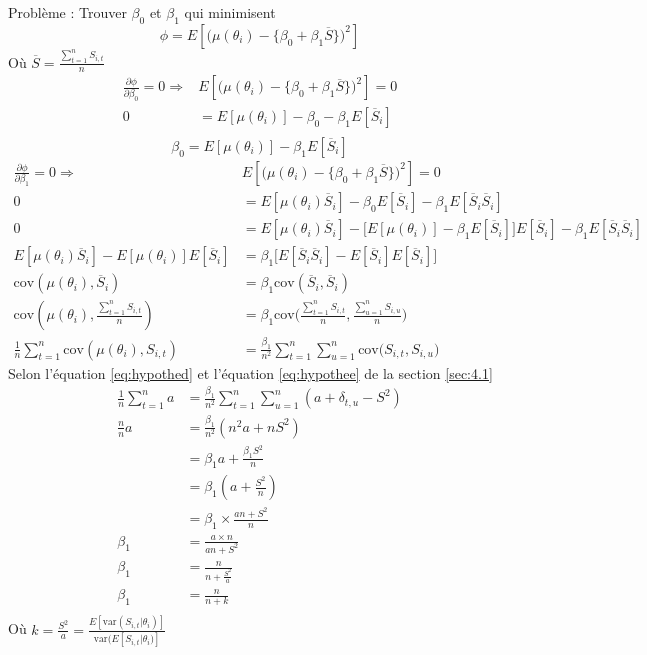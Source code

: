 Problème : Trouver  $\beta_0 $ et $\beta_1$ qui minimisent $$\phi = E[\big( \mu(\theta_i) - \lbrace\beta_0 + \beta_1 \overline{S}\rbrace \big)^2]$$
Où $\overline{S} = \frac{\sum_{t=1}^{n} S_{i,t}}{n}$
\begin{align*}
\frac{\partial \phi}{\partial \beta_0} = 0 \Rightarrow &  E[\big( \mu(\theta_i) - \lbrace\beta_0 + \beta_1 \overline{S}\rbrace \big)^2] = 0 \\
0 &= E[\mu(\theta_i)] - \beta_0 - \beta_1 E[\overline{S}_i]\\
\end{align*}
\begin{equation}
\beta_0 = E[\mu(\theta_i)] - \beta_1 E[\overline{S}_i]
\end{equation}
\begin{align*}
\frac{\partial \phi}{\partial \beta_1} = 0 \Rightarrow &  E[\big( \mu(\theta_i) - \lbrace\beta_0 + \beta_1 \overline{S}\rbrace \big)^2] = 0 \\
0 &= E[\mu(\theta_i)\overline{S}_i] - \beta_0E[\overline{S}_i] - \beta_1 E[\overline{S}_i\overline{S}_i]\\
0 &= E[\mu(\theta_i)\overline{S}_i] - \Big[E[\mu(\theta_i)] - \beta_1 E[\overline{S}_i] \Big] E[\overline{S}_i] - \beta_1 E[\overline{S}_i\overline{S}_i]\\
E[\mu(\theta_i)\overline{S}_i] - E[\mu(\theta_i)]E[\overline{S}_i] &= \beta_1 \Big[E[\overline{S}_i\overline{S}_i] - E[\overline{S}_i]E[\overline{S}_i] \Big] \\
\text{cov}(\mu(\theta_i), \overline{S}_i) &= \beta_1 \text{cov}( \overline{S}_i, \overline{S}_i) \\
\text{cov}(\mu(\theta_i), \frac{\sum_{t=1}^{n} S_{i,t}}{n}) &= \beta_1 \text{cov}\Bigg( \frac{\sum_{t=1}^{n} S_{i,t}}{n}, \frac{\sum_{u=1}^{n} S_{i,u}}{n}\Bigg) \\
\frac{1}{n} \sum_{t=1}^{n}\text{cov}(\mu(\theta_i),  S_{i,t}) &= \frac{\beta_1}{n^2} \sum_{t=1}^{n}\sum_{u=1}^{n}\text{cov}\Bigg( S_{i,t}, S_{i,u}\Bigg)
\end{align*}
Selon l'équation \ref{eq:hypothed} et l'équation \ref{eq:hypothee} de la section \ref{sec:4.1}
\begin{align*}
\frac{1}{n} \sum_{t=1}^{n} a &= \frac{\beta_1}{n^2} \sum_{t=1}^{n}\sum_{u=1}^{n}(a + \delta_{t,u} - S^2)\\
\frac{n}{n} a &= \frac{\beta_1}{n^2} (n^2a + nS^2)\\
&= \beta_1 a + \frac{\beta_1 S^2}{n}\\
&= \beta_1 (a + \frac{S^2}{n})\\
&= \beta_1 \times \frac{an+ S^2}{n}\\
\beta_1 &=  \frac{a\times n}{an+ S^2}\\
\beta_1 &=  \frac{n}{n+ \frac{S^2}{a}}\\
\beta_1 &=  \frac{n}{n+ k}\\
\end{align*}
Où $k = \frac{S^2}{a} = \frac{E[\text{var}(S_{i,t}|\theta_i)]}{\text{var}(E[S_{i,t}|\theta_i)]}$

